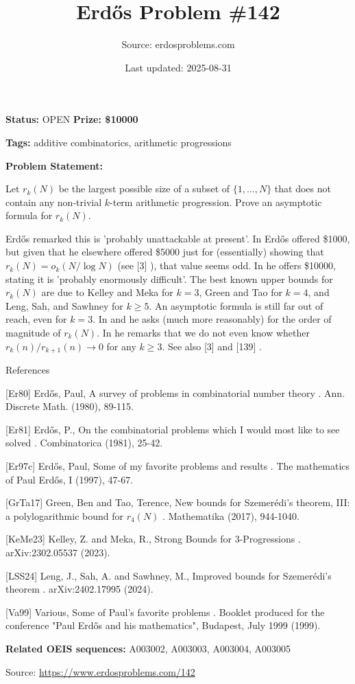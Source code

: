\documentclass{article}
\title{Erd\H{o}s Problem \#142}
\date{Last updated: 2025-08-31}
\author{Source: erdosproblems.com}
\begin{document}
\maketitle

\noindent\textbf{Status:} OPEN \quad \textbf{Prize: \$10000}

\noindent\textbf{Tags:} additive combinatorics, arithmetic progressions

\medskip

\noindent\textbf{Problem Statement:}

Let $r_k(N)$ be the largest possible size of a subset of $\{1,\ldots,N\}$ that does not contain any non-trivial $k$-term arithmetic progression. Prove an asymptotic formula for $r_k(N)$.




Erd\H{o}s remarked this is 'probably unattackable at present'. In \cite{Er97c} Erd\H{o}s offered \$1000, but given that he elsewhere offered \$5000 just for (essentially) showing that $r_k(N)=o_k(N/\log N)$ (see [3] ), that value seems odd. In \cite{Er81} he offers \$10000, stating it is 'probably enormously difficult'. The best known upper bounds for $r_k(N)$ are due to Kelley and Meka \cite{KeMe23} for $k=3$, Green and Tao \cite{GrTa17} for $k=4$, and Leng, Sah, and Sawhney \cite{LSS24} for $k\geq 5$. An asymptotic formula is still far out of reach, even for $k=3$. In \cite{Er80} and \cite{Va99} he asks (much more reasonably) for the order of magnitude of $r_k(N)$. In \cite{Er80} he remarks that we do not even know whether $r_k(n)/r_{k+1}(n)\to 0$ for any $k\geq 3$. See also [3] and [139] .




References

[Er80] Erd\H{o}s, Paul, A survey of problems in combinatorial number theory . Ann. Discrete Math. (1980), 89-115.

[Er81] Erd\H{o}s, P., On the combinatorial problems which I would most like to see solved . Combinatorica (1981), 25-42.

[Er97c] Erd\H{o}s, Paul, Some of my favorite problems and results . The mathematics of Paul Erd\H{o}s, I (1997), 47-67.

[GrTa17] Green, Ben and Tao, Terence, New bounds for Szemer\'{e}di's theorem, III: a polylogarithmic bound for $r_4(N)$ . Mathematika (2017), 944-1040.

[KeMe23] Kelley, Z. and Meka, R., Strong Bounds for 3-Progressions . arXiv:2302.05537 (2023).

[LSS24] Leng, J., Sah, A. and Sawhney, M., Improved bounds for Szemer\'{e}di's theorem . arXiv:2402.17995 (2024).

[Va99] Various, Some of Paul's favorite problems . Booklet produced for the conference "Paul Erd\H{o}s and his mathematics", Budapest, July 1999 (1999).

\noindent\textbf{Related OEIS sequences:} A003002, A003003, A003004, A003005


\bigskip
\noindent\small{Source: \url{https://www.erdosproblems.com/142}}
\end{document}
